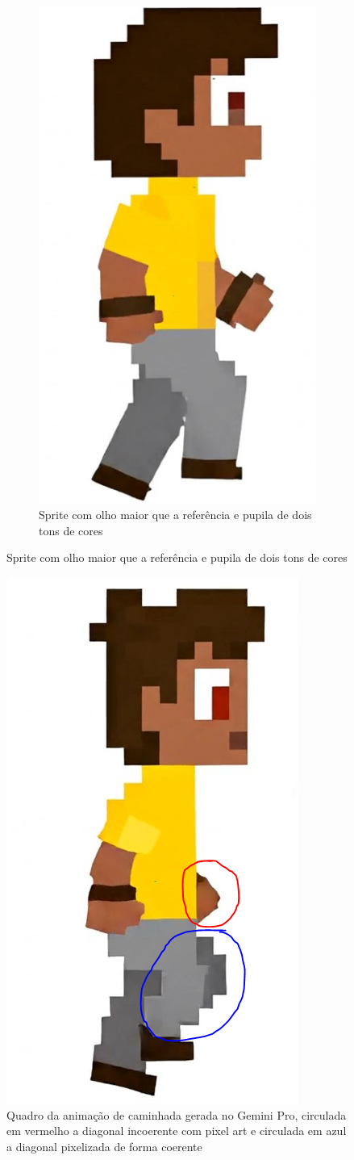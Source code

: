 \begin{figure}[htbp]
\begin{subfigure}{0.32\linewidth}
        \includegraphics[width=0.7\linewidth]{figs/geminiPro/chat3/sprite2.PNG}
        \caption{\small Sprite com olho maior que a referência e pupila de dois tons de cores}
        \label{fig:GeminiProAndarComparaSprite2}
    \end{subfigure}

\end{figure}

\begin{figure}[htbp]
    \centering
    \caption{\small Quadro da animação de caminhada gerada no Gemini Pro, circulada em vermelho a diagonal incoerente com pixel art e circulada em azul a diagonal pixelizada de forma coerente}
    \label{fig:geminiProAndarQuadroPixelCoerente}
    \includegraphics[width=0.3\linewidth]{figs/geminiPro/chat3/animacaoPixelArt.PNG}
\end{figure}

